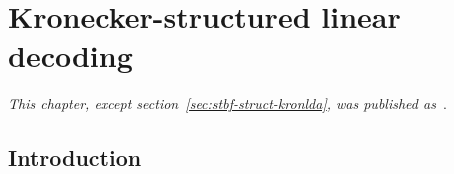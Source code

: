 \chapter{Kronecker-structured linear decoding}
\label{sec:stbf-struct}
\newcommand{\pv}[1]{
	#1
}

  \emph{This chapter, except section~\ref{sec:stbf-struct-kronlda}, was
  published as~\textcite{VanDenKerchove2022}}.

	\section{Introduction}



